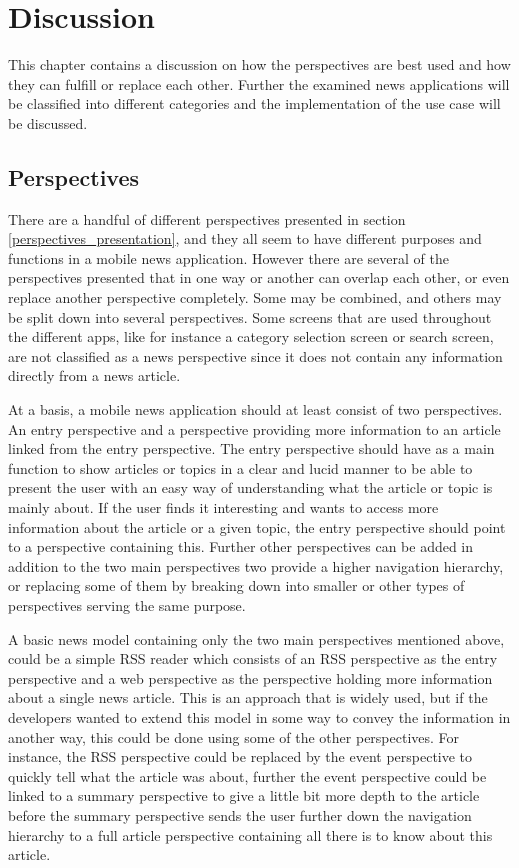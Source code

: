 \chapter{Discussion}
\label{chapter_discussion}
This chapter contains a discussion on how the perspectives are best used and how they can fulfill or replace each other. Further the examined news applications will be classified into different categories and the implementation of the use case will be discussed.

\section{Perspectives}
There are a handful of different perspectives presented in section \ref{perspectives_presentation}, and they all seem to have different purposes and functions in a mobile news application. However there are several of the perspectives presented that in one way or another can overlap each other, or even replace another perspective completely. Some may be combined, and others may be split down into several perspectives. Some screens that are used throughout the different apps, like for instance a category selection screen or search screen, are not classified as a news perspective since it does not contain any information directly from a news article.

At a basis, a mobile news application should at least consist of two perspectives. An entry perspective and a perspective providing more information to an article linked from the entry perspective. The entry perspective should have as a main function to show articles or topics in a clear and lucid manner to be able to present the user with an easy way of understanding what the article or topic is mainly about. If the user finds it interesting and wants to access more information about the article or a given topic, the entry perspective should point to a perspective containing this. Further other perspectives can be added in addition to the two main perspectives two provide a higher navigation hierarchy, or replacing some of them by breaking down into smaller or other types of perspectives serving the same purpose.

A basic news model containing only the two main perspectives mentioned above, could be a simple RSS reader which consists of an RSS perspective as the entry perspective and a web perspective as the perspective holding more information about a single news article. This is an approach that is widely used, but if the developers wanted to extend this model in some way to convey the information in another way, this could be done using some of the other perspectives. For instance, the RSS perspective could be replaced by the event perspective to quickly tell what the article was about, further the event perspective could be linked to a summary perspective to give a little bit more depth to the article before the summary perspective sends the user further down the navigation hierarchy to a full article perspective containing all there is to know about this article.

